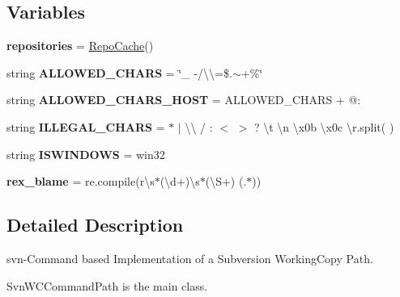 \subsection*{Variables}
\begin{DoxyCompactItemize}
\item 
\mbox{\label{namespacepy_1_1__path_1_1svnwc_ad00a1119853c7345af1c44b854e2262d}} 
{\bfseries repositories} = \hyperlink{classpy_1_1__path_1_1svnwc_1_1_repo_cache}{Repo\+Cache}()
\item 
\mbox{\label{namespacepy_1_1__path_1_1svnwc_a20f55118063fb4f35ff64a45923119c5}} 
string {\bfseries A\+L\+L\+O\+W\+E\+D\+\_\+\+C\+H\+A\+RS} = \char`\"{}\+\_\+ -\//\textbackslash{}\textbackslash{}=\$.$\sim$+\%\char`\"{}
\item 
\mbox{\label{namespacepy_1_1__path_1_1svnwc_ad92f966481e05a044d398b8667e89d60}} 
string {\bfseries A\+L\+L\+O\+W\+E\+D\+\_\+\+C\+H\+A\+R\+S\+\_\+\+H\+O\+ST} = A\+L\+L\+O\+W\+E\+D\+\_\+\+C\+H\+A\+RS + \textquotesingle{}@\+:\textquotesingle{}
\item 
\mbox{\label{namespacepy_1_1__path_1_1svnwc_a6cc6c60dc30c90a45e705a9c6a21fe46}} 
string {\bfseries I\+L\+L\+E\+G\+A\+L\+\_\+\+C\+H\+A\+RS} = \textquotesingle{}$\ast$ $\vert$ \textbackslash{}\textbackslash{} / \+: $<$ $>$ ? \textbackslash{}t \textbackslash{}n \textbackslash{}x0b \textbackslash{}x0c \textbackslash{}r\textquotesingle{}.split(\textquotesingle{} \textquotesingle{})
\item 
\mbox{\label{namespacepy_1_1__path_1_1svnwc_a562171899a1b92f972025e66dfd31ecb}} 
string {\bfseries I\+S\+W\+I\+N\+D\+O\+WS} = \textquotesingle{}win32\textquotesingle{}
\item 
\mbox{\label{namespacepy_1_1__path_1_1svnwc_a5f431a39ec22ed52bfc023e02cc8c18a}} 
{\bfseries rex\+\_\+blame} = re.\+compile(r\textquotesingle{}\textbackslash{}s$\ast$(\textbackslash{}d+)\textbackslash{}s$\ast$(\textbackslash{}S+) (.$\ast$)\textquotesingle{})
\end{DoxyCompactItemize}


\subsection{Detailed Description}
\begin{DoxyVerb}svn-Command based Implementation of a Subversion WorkingCopy Path.

  SvnWCCommandPath  is the main class.\end{DoxyVerb}
 

